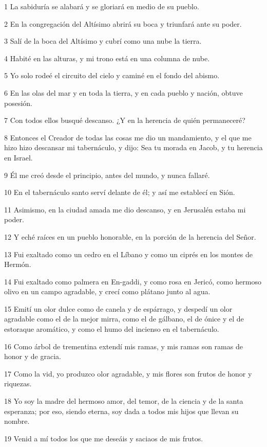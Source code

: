 \par 1 La sabiduría se alabará y se gloriará en medio de su pueblo.
\par 2 En la congregación del Altísimo abrirá su boca y triunfará ante su poder.
\par 3 Salí de la boca del Altísimo y cubrí como una nube la tierra.
\par 4 Habité en las alturas, y mi trono está en una columna de nube.
\par 5 Yo solo rodeé el circuito del cielo y caminé en el fondo del abismo.
\par 6 En las olas del mar y en toda la tierra, y en cada pueblo y nación, obtuve posesión.
\par 7 Con todos ellos busqué descanso. ¿Y en la herencia de quién permaneceré?
\par 8 Entonces el Creador de todas las cosas me dio un mandamiento, y el que me hizo hizo descansar mi tabernáculo, y dijo: Sea tu morada en Jacob, y tu herencia en Israel.
\par 9 Él me creó desde el principio, antes del mundo, y nunca fallaré.
\par 10 En el tabernáculo santo serví delante de él; y así me establecí en Sión.
\par 11 Asimismo, en la ciudad amada me dio descanso, y en Jerusalén estaba mi poder.
\par 12 Y eché raíces en un pueblo honorable, en la porción de la herencia del Señor.
\par 13 Fui exaltado como un cedro en el Líbano y como un ciprés en los montes de Hermón.
\par 14 Fui exaltado como palmera en En-gaddi, y como rosa en Jericó, como hermoso olivo en un campo agradable, y crecí como plátano junto al agua.
\par 15 Emití un olor dulce como de canela y de espárrago, y despedí un olor agradable como el de la mejor mirra, como el de gálbano, el de ónice y el de estoraque aromático, y como el humo del incienso en el tabernáculo.
\par 16 Como árbol de trementina extendí mis ramas, y mis ramas son ramas de honor y de gracia.
\par 17 Como la vid, yo produzco olor agradable, y mis flores son frutos de honor y riquezas.
\par 18 Yo soy la madre del hermoso amor, del temor, de la ciencia y de la santa esperanza; por eso, siendo eterna, soy dada a todos mis hijos que llevan su nombre.
\par 19 Venid a mí todos los que me deseáis y saciaos de mis frutos.
